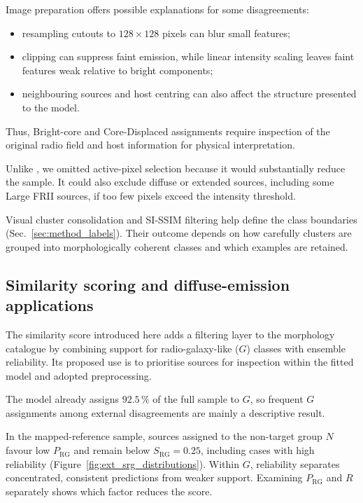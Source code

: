 Image preparation offers possible explanations for some disagreements: 
\begingroup
{}
\begin{itemize}[itemsep=2pt, parsep=0pt, topsep=3pt]
\item resampling cutouts to \(128\times128\) pixels can blur small features;
\item clipping can suppress faint emission, while linear intensity scaling leaves faint features weak relative to bright components;
\item neighbouring sources and host centring can also affect the structure presented to the model.
\end{itemize}
\endgroup
Thus, Bright-core and Core-Displaced assignments require inspection of the original radio field and host information for physical interpretation.

Unlike \citet{Nicolas2025}, we omitted active-pixel selection because it would substantially reduce the sample.
It could also exclude diffuse or extended sources, including some Large FRII sources, if too few pixels exceed the intensity threshold.

Visual cluster consolidation and SI-SSIM filtering help define the class boundaries (Sec.~\ref{sec:method_labels}). Their outcome depends on how carefully clusters are grouped into morphologically coherent classes and which examples are retained.

\subsection{Similarity scoring and diffuse-emission applications}
\label{sec:discussion_score}
\label{sec:discussion_relics}

The similarity score introduced here adds a filtering layer to the morphology catalogue by combining support for radio-galaxy-like (\(G\)) classes with ensemble reliability.
Its proposed use is to prioritise sources for inspection within the fitted model and adopted preprocessing.

The model already assigns \(92.5\,\%\) of the full sample to \(G\), so frequent \(G\) assignments among external disagreements are mainly a descriptive result.

In the mapped-reference sample, sources assigned to the non-target group \(N\) favour low \(P_\mathrm{RG}\) and remain below \(S_\mathrm{RG}=0.25\), including cases with high reliability (Figure~\ref{fig:ext_srg_distributions}). Within \(G\), reliability separates concentrated, consistent predictions from weaker support. Examining \(P_\mathrm{RG}\) and \(R\) separately shows which factor reduces the score. 

